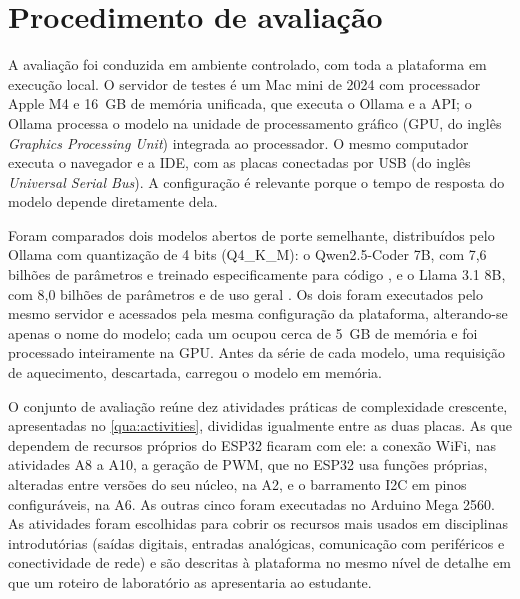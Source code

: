 \section{Procedimento de avaliação}
\label{sec:method-evaluation}

A avaliação foi conduzida em ambiente controlado, com toda a plataforma em execução local. O servidor de testes é um Mac mini de 2024 com processador Apple M4 e 16~GB de memória unificada, que executa o Ollama e a API; o Ollama processa o modelo na unidade de processamento gráfico (GPU, do inglês \textit{Graphics Processing Unit}) integrada ao processador. O mesmo computador executa o navegador e a IDE, com as placas conectadas por USB (do inglês \textit{Universal Serial Bus}). A configuração é relevante porque o tempo de resposta do modelo depende diretamente dela.

Foram comparados dois modelos abertos de porte semelhante, distribuídos pelo Ollama com quantização de 4 bits (Q4\_K\_M): o Qwen2.5-Coder 7B, com 7,6 bilhões de parâmetros e treinado especificamente para código \cite{hui2024}, e o Llama 3.1 8B, com 8,0 bilhões de parâmetros e de uso geral \cite{grattafiori2024}. Os dois foram executados pelo mesmo servidor e acessados pela mesma configuração da plataforma, alterando-se apenas o nome do modelo; cada um ocupou cerca de 5~GB de memória e foi processado inteiramente na GPU. Antes da série de cada modelo, uma requisição de aquecimento, descartada, carregou o modelo em memória.

O conjunto de avaliação reúne dez atividades práticas de complexidade crescente, apresentadas no \autoref{qua:activities}, divididas igualmente entre as duas placas. As que dependem de recursos próprios do ESP32 ficaram com ele: a conexão WiFi, nas atividades A8 a A10, a geração de PWM, que no ESP32 usa funções próprias, alteradas entre versões do seu núcleo, na A2, e o barramento I2C em pinos configuráveis, na A6. As outras cinco foram executadas no Arduino Mega 2560. As atividades foram escolhidas para cobrir os recursos mais usados em disciplinas introdutórias (saídas digitais, entradas analógicas, comunicação com periféricos e conectividade de rede) e são descritas à plataforma no mesmo nível de detalhe em que um roteiro de laboratório as apresentaria ao estudante.


